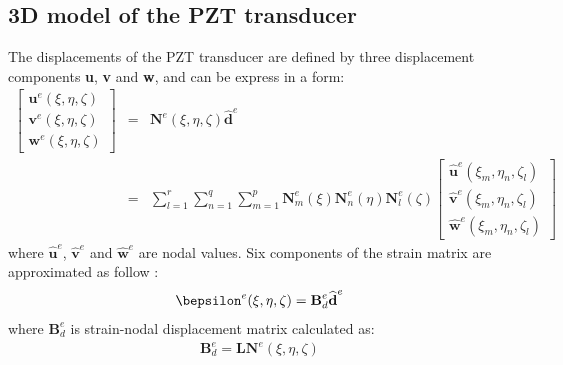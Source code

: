 \documentclass[a4paper,12pt]{article}
\begin{document}
\subsection{3D model of the PZT transducer}
\label{sec:3D_SEM}
The displacements of the PZT transducer are defined by three displacement components \textbf{u}, \textbf{v} and \textbf{w}, and can be express in a form:
\begin{eqnarray}
\left [ \begin{array}{c}
\textbf{u}^e(\xi,\eta,\zeta) \\
\textbf{v}^e(\xi,\eta,\zeta) \\
\textbf{w}^e(\xi,\eta,\zeta)
\end{array} \right]
& = & \textbf{N}^e(\xi,\eta, \zeta)\widehat{\textbf{d}}^e\nonumber\\
& = & \sum_{l=1}^r\sum_{n=1}^q\sum_{m=1}^p\textbf{N}_m^e(\xi)\textbf{N}_n^e(\eta)\textbf{N}_l^e(\zeta)
\left [ \begin{array}{c}
\widehat{\textbf{u}}^e(\xi_m,\eta_n,\zeta_l) \\
\widehat{\textbf{v}}^e(\xi_m,\eta_n,\zeta_l) \\
\widehat{\textbf{w}}^e(\xi_m,\eta_n,\zeta_l)
\end{array} \right]
\label{eq:3D_displ}
\end{eqnarray}
where $\widehat{\textbf{u}}^e$, $\widehat{\textbf{v}}^e$ and $\widehat{\textbf{w}}^e$ are nodal values.
Six components of the strain matrix are approximated as follow 
\cite{kudela20093d}:
\begin{eqnarray}
\bepsilon^e(\xi,\eta,\zeta)=\textbf{B}_{d}^e\widehat{\textbf{d}}^e
\end{eqnarray}
where $\textbf{B}_{d}^e$ is strain-nodal displacement matrix calculated as:
\begin{eqnarray}
\textbf{B}_{d}^e=\textbf{L}\textbf{N}^e(\xi,\eta,\zeta)
\end{eqnarray}
\end{document}

